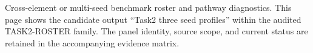 Cross-element or multi-seed benchmark roster and pathway diagnostics. This page shows the candidate output ``Task2 three seed profiles'' within the audited TASK2-ROSTER family. The panel identity, source scope, and current status are retained in the accompanying evidence matrix.
